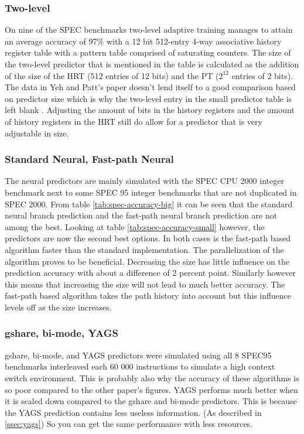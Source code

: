 \subsubsection*{Two-level}
On nine of the SPEC benchmarks two-level adaptive training manages to attain an average accuracy of 97\% with a 12 bit 512-entry 4-way associative history register table with a pattern table comprised of saturating counters. 
The size of the two-level predictor that is mentioned in the table is calculated as the addition of the size of the HRT (512 entries of 12 bits) and the PT ($2^{12}$ entries of 2 bits). 
The data in Yeh and Patt's paper doesn't lend itself to a good comparison based on predictor size which is why the two-level entry in the small predictor table is left blank \cite{twolevel}. 
Adjusting the amount of bits in the history registers and the amount of history registers in the HRT still do allow for a predictor that is very adjustable in size.


\subsubsection*{Standard Neural, Fast-path Neural}
The neural predictors are mainly simulated with the SPEC CPU 2000 integer benchmark next to some SPEC 95 integer benchmarks that are not duplicated in SPEC 2000. From table \ref{tab:spec-accuracy-big} it can be seen that the standard neural branch prediction and the fast-path neural branch prediction are not among the best. Looking at table \ref{tab:spec-accuracy-small} however, the predictors are now the second best options. In both cases is the fast-path based algorithm faster than the standard implementation. The parallelization of the algorithm proves to be beneficial. Decreasing the size has little influence on the prediction accuracy with about a difference of 2 percent point. Similarly however this means that increasing the size will not lead to much better accuracy. The fast-path based algorithm takes the path history into account but this influence levels off as the size increases.

\subsubsection*{gshare, bi-mode, YAGS}
gshare, bi-mode, and YAGS predictors were simulated using all 8 SPEC95 benchmarks interleaved each 60 000 instructions to simulate a high context switch environment.
This is probably also why the accuracy of these algorithms is so poor compared to the other paper's figures.
YAGS performs much better when it is scaled down compared to the gshare and bi-mode predictors.
This is because the YAGS prediction contains less useless information. (As described in \ref{ssec:yags})
So you can get the same performance with less resources.
